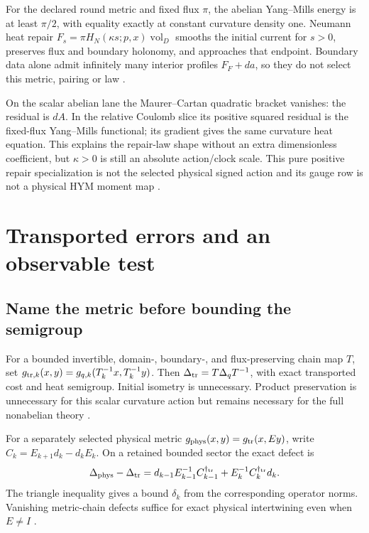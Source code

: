 \documentclass[11pt]{article}
\theoremstyle{definition}
\theoremstyle{remark}
\begin{document}
For the declared round metric and fixed flux \(\pi\), the abelian
Yang--Mills energy is at least \(\pi/2\), with equality exactly at constant
curvature density one. Neumann heat repair
\(F_s=\pi H_N(\kappa s;p,x)\operatorname{vol}_D\) smooths the initial
current for \(s>0\), preserves flux and boundary holonomy, and approaches
that endpoint. Boundary data alone admit infinitely many interior profiles
\(F_F+da\), so they do not select this metric, pairing or law
\cite{beq38}.

On the scalar abelian lane the Maurer--Cartan quadratic bracket vanishes:
the residual is \(dA\). In the relative Coulomb slice its positive squared
residual is the fixed-flux Yang--Mills functional; its gradient gives the
same curvature heat equation. This explains the repair-law shape without
an extra dimensionless coefficient, but \(\kappa>0\) is still an absolute
action/clock scale. This pure positive repair specialization is not the
selected physical signed action and its gauge row is not a physical HYM
moment map \cite{beq41}.

\section{Transported errors and an observable test}
\label{sec:observable-test}

\subsection{Name the metric before bounding the semigroup}
\label{sec:metric-qualification}
For a bounded invertible, domain-, boundary-, and flux-preserving chain
map \(T\), set
\(g_{{\rm tr},k}(x,y)=g_{q,k}(T_k^{-1}x,T_k^{-1}y)\).
Then \(\Delta_{\rm tr}=T\Delta_qT^{-1}\), with exact transported cost and
heat semigroup. Initial isometry is unnecessary. Product preservation
is unnecessary for this scalar curvature action but remains necessary
for the full nonabelian theory \cite{beq40}.

For a separately selected physical metric
\(g_{\rm phys}(x,y)=g_{\rm tr}(x,Ey)\), write
\(C_k=E_{k+1}d_k-d_kE_k\). On a retained bounded sector the exact defect is
\[
\Delta_{\rm phys}-\Delta_{\rm tr}
=d_{k-1}E_{k-1}^{-1}C_{k-1}^{\dagger_{\rm tr}}
 +E_k^{-1}C_k^{\dagger_{\rm tr}}d_k.
\]
The triangle inequality gives a bound \(\delta_k\) from the corresponding
operator norms. Vanishing metric-chain defects suffice for exact physical
intertwining even when \(E\ne I\) \cite{beq40}.
\end{document}
